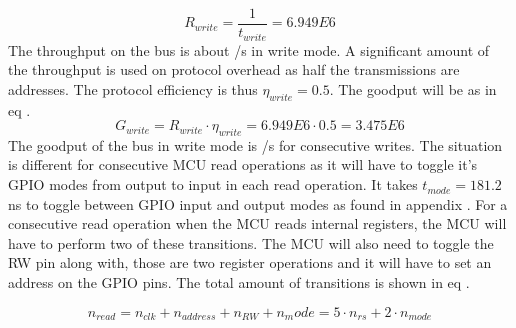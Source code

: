 \begin{equation}\label{eq:7_2_1_Write_ThroughPut3}
    R_{write} = \frac{1}{t_{write}} = 6.949E6 
\end{equation}
The throughput on the bus is about /s in write mode. A significant amount of the throughput is used on protocol overhead as half the transmissions are addresses. The protocol efficiency is thus $\eta_{write} = 0.5$. The goodput will be as in eq .
\begin{equation}\label{eq:7_2_1_Write_GoodPut}
    G_{write} = R_{write}\cdot \eta_{write} = 6.949E6 \cdot 0.5 = 3.475E6 
\end{equation}
The goodput of the bus in write mode is /s for consecutive writes. The situation is different for consecutive MCU read operations as it will have to toggle it's GPIO modes from output to input in each read operation. It takes $t_{mode} = 181.2$ns to toggle between GPIO input and output modes as found in appendix . For a consecutive read operation when the MCU reads internal registers, the MCU will have to perform two of these transitions. The MCU will also need to toggle the RW pin along with, those are two register operations and it will have to set an address on the GPIO pins. The total amount of transitions is shown in eq .

\begin{equation}\label{eq:7_2_1_Read_Register1}
    n_{read} = n_{clk} + n_{address} + n_{RW} + {n_mode} = 5 \cdot n_{rs} + 2 \cdot n_{mode} 
\end{equation}

